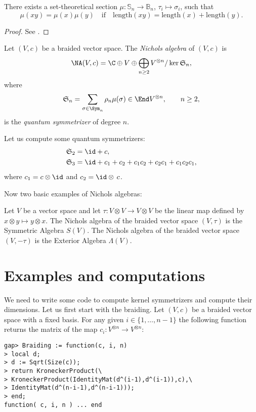 \begin{lemma}
	There exists a set-theoretical section
	$\mu:\mathbb{S}_{n}\to\mathbb{B}_{n}$, $\tau_{i}\mapsto\sigma_{i}$, such
	that 
	\[
	\mu(xy)=\mu(x)\mu(y) \quad \text{if}\quad 
 \mathrm{length}(xy)=\mathrm{length}(x)+\mathrm{length}(y). 
	\]
\end{lemma}

\begin{proof}
	See \cite{bibid}.
\end{proof}

Let $(V,c)$ be a braided vector space. The \emph{Nichols algebra} of $(V,c)$ is 
\[
\NA(V,c)=\C\oplus V\oplus \bigoplus_{n\geq2}V^{\otimes n}/\ker\mathfrak{S}_n,
\]
where 
\[
\mathfrak{S}_{n}=\sum_{\sigma\in\Sym_{n}}\rho_{n}\mu(\sigma)\in \End V^{\otimes n}, \qquad n\geq 2,
\]
is the \emph{quantum symmetrizer} of degree $n$.

\begin{example}
	Let us compute some quantum symmetrizers:
	\begin{align*}
		&\mathfrak{S}_2 = \id+c,\\
		&\mathfrak{S}_3 = \id+c_{1}+c_{2}+c_{1}c_{2}+c_{2}c_{1}+c_{1}c_{2}c_{1},
	\end{align*}
	where $c_1=c\otimes\id$ and $c_2=\id\otimes\, c$. 
\end{example}

Now two basic examples of Nichols algebras:

\begin{example}
	Let $V$ be a vector space and let $\tau:V\otimes V\to V\otimes V$
	be the linear map defined by $x\otimes y\mapsto y\otimes x$. The Nichols
	algebra of the braided vector space $(V,\tau)$ is the Symmetric Algebra
	$S(V)$. The Nichols algebra of the braided vector space $(V,-\tau)$ is the
	Exterior Algebra $\Lambda(V)$.
\end{example}

\section{Examples and computations}

We need to write some code to compute kernel symmetrizers and compute their
dimensions.  Let us first start with the braiding. Let $(V,c)$ be a braided
vector space with a fixed basis. For any given $i\in\{1,\dots,n-1\}$ the
following function returns the matrix of the map $c_i\colon V^{\otimes n}\to
V^{\otimes n}$:

\begin{lstlisting}
gap> Braiding := function(c, i, n)
> local d;
> d := Sqrt(Size(c));
> return KroneckerProduct(\
> KroneckerProduct(IdentityMat(d^(i-1),d^(i-1)),c),\
> IdentityMat(d^(n-i-1),d^(n-i-1)));
> end;
function( c, i, n ) ... end
\end{lstlisting}

